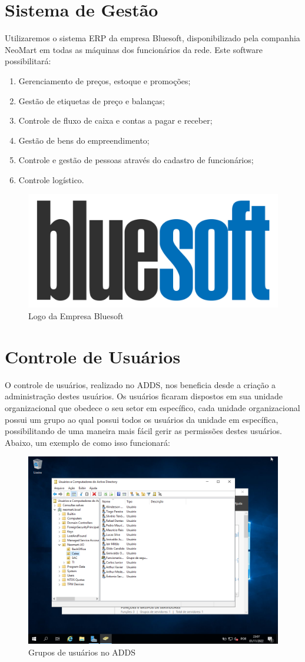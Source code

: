 \documentclass[12pt]{article}
\begin{document}
\section{Sistema de Gestão}
Utilizaremos o sistema ERP da empresa Bluesoft, disponibilizado pela companhia NeoMart em todas as máquinas dos funcionários da rede. Este software possibilitará:

\begin{enumerate}
    \item Gerenciamento de preços, estoque e promoções;
    \item Gestão de etiquetas de preço e balanças;
    \item Controle de fluxo de caixa e contas a pagar e receber;
    \item Gestão de bens do empreendimento;
    \item Controle e gestão de pessoas através do cadastro de funcionários;
    \item Controle logístico.
\end{enumerate}

\begin{figure}[ht]
\centering
\includegraphics[height=0.2\textwidth]{Logo-bluesoft.png}
\caption{Logo da Empresa Bluesoft}
\label{fig:adds-pastas}
\end{figure}

\section{Controle de Usuários}
O controle de usuários, realizado no ADDS, nos beneficia desde a criação a administração destes usuários. Os usuários ficaram dispostos em sua unidade organizacional que obedece o seu setor em específico, cada unidade organizacional possui um grupo ao qual possui todos os usuários da unidade em específica, possibilitando de uma maneira mais fácil gerir as permissões destes usuários. Abaixo, um exemplo de como isso funcionará:

\begin{figure}[ht]
\centering
\includegraphics[height=0.5\textwidth]{adds-unidades-usuarios.png}
\caption{Grupos de usuários no ADDS}
\label{fig:adds-pastas}
\end{figure}
\end{document}
